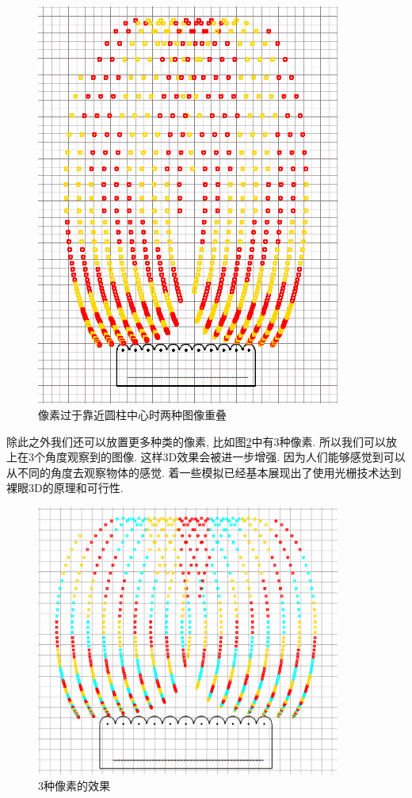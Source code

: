 \documentclass[a4paper, 11pt]{article}
\begin{document}
\begin{CJK}{UTF8}{gbsn}
\begin{figure}[h!]
  \centerline{\includegraphics[width=10cm]{229.png}}
  \caption{像素过于靠近圆柱中心时两种图像重叠}
  \label{fig:229}
\end{figure}

除此之外我们还可以放置更多种类的像素, 比如图\ref{fig:230}中有3种像素. 所以我们可以放上在3个角度观察到的图像. 这样3D效果会被进一步增强. 因为人们能够感觉到可以从不同的角度去观察物体的感觉. 着一些模拟已经基本展现出了使用光栅技术达到裸眼3D的原理和可行性.
\begin{figure}[h!]
  \centerline{\includegraphics[width=10cm]{230.png}}
  \caption{3种像素的效果}
  \label{fig:230}
\end{figure}



\end{CJK}
\end{document}
